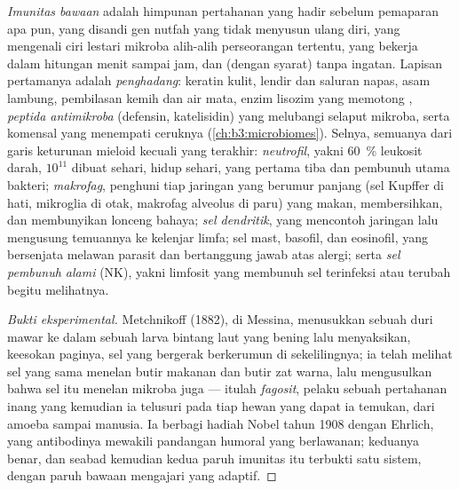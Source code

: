 \begin{definition}\label{def:b3:innate-immunity:innate}
%
\emph{Imunitas bawaan} adalah himpunan pertahanan yang hadir sebelum
pemaparan apa pun, yang disandi gen nutfah yang tidak menyusun ulang diri, yang
mengenali ciri lestari mikroba alih-alih perseorangan tertentu, yang bekerja
dalam hitungan menit sampai jam, dan (dengan syarat) tanpa ingatan. Lapisan
pertamanya adalah \emph{penghadang}: keratin kulit, lendir dan
 saluran napas, asam lambung, pembilasan kemih
dan air mata, enzim lisozim yang memotong ,
\emph{peptida antimikroba} (defensin, katelisidin) yang melubangi
selaput mikroba, serta  komensal yang menempati
ceruknya (\cref{ch:b3:microbiomes}). Selnya, semuanya dari garis
keturunan mieloid kecuali yang terakhir: \emph{neutrofil}, yakni \qty{60}{\%}
leukosit darah, $10^{11}$ dibuat sehari, hidup sehari, yang pertama tiba dan
pembunuh utama bakteri; \emph{makrofag}, penghuni tiap jaringan yang
berumur panjang (sel Kupffer di hati, mikroglia di otak,
makrofag alveolus di paru) yang makan, membersihkan, dan membunyikan
lonceng bahaya; \emph{sel dendritik}, yang mencontoh jaringan lalu mengusung
temuannya ke kelenjar limfa; sel mast, basofil, dan eosinofil, yang bersenjata
melawan parasit dan bertanggung jawab atas alergi; serta \emph{sel pembunuh
alami} (NK), yakni limfosit yang membunuh sel terinfeksi atau terubah begitu
melihatnya.
\end{definition}

\begin{proof}[Bukti eksperimental]
Metchnikoff (1882), di Messina, menusukkan sebuah duri mawar ke dalam sebuah
larva bintang laut yang bening lalu menyaksikan, keesokan paginya, sel yang
bergerak berkerumun di sekelilingnya; ia telah melihat sel yang sama menelan
butir makanan dan butir zat warna, lalu mengusulkan bahwa sel itu menelan
mikroba juga --- itulah \emph{fagosit}, pelaku sebuah pertahanan inang yang
kemudian ia telusuri pada tiap hewan yang dapat ia temukan, dari amoeba sampai
manusia. Ia berbagi hadiah Nobel tahun 1908 dengan Ehrlich, yang antibodinya
mewakili pandangan humoral yang berlawanan; keduanya benar, dan seabad kemudian
kedua paruh imunitas itu terbukti satu sistem, dengan paruh bawaan mengajari
yang adaptif.
\end{proof}

